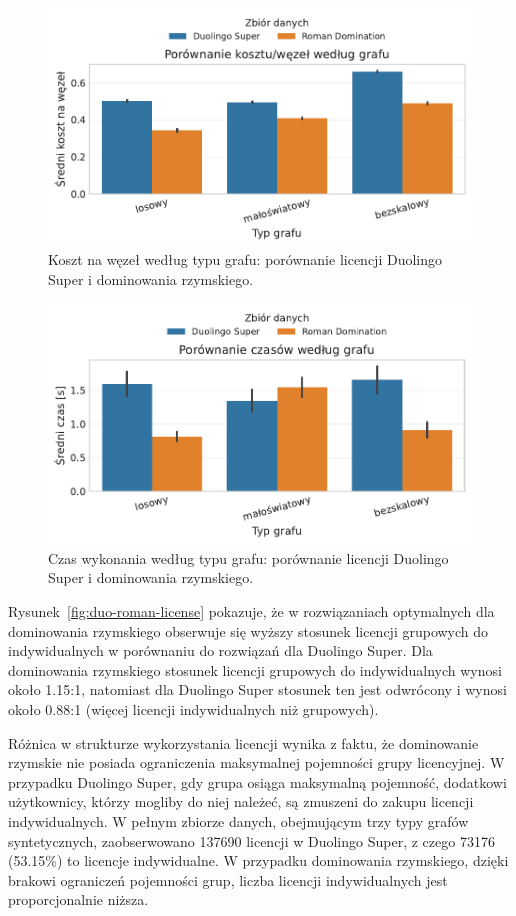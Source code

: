 \begin{figure}[H]
  \centering
  \includegraphics[width=0.6\linewidth]{assets/figures/benchmark/real/duo_vs_roman_cost_per_node_by_graph.pdf}
  \caption{Koszt na węzeł według typu grafu: porównanie licencji Duolingo Super i dominowania rzymskiego.}
  \label{fig:duo-roman-cost}
\end{figure}

\begin{figure}[H]
  \centering
  \includegraphics[width=0.6\linewidth]{assets/figures/benchmark/real/duo_vs_roman_time_by_graph.pdf}
  \caption{Czas wykonania według typu grafu: porównanie licencji Duolingo Super i dominowania rzymskiego.}
  \label{fig:duo-roman-time}
\end{figure}

Rysunek~\ref{fig:duo-roman-license} pokazuje, że w rozwiązaniach optymalnych dla dominowania rzymskiego obserwuje się wyższy stosunek licencji grupowych do indywidualnych w porównaniu do rozwiązań dla Duolingo Super. Dla dominowania rzymskiego stosunek licencji grupowych do indywidualnych wynosi około 1.15:1, natomiast dla Duolingo Super stosunek ten jest odwrócony i wynosi około 0.88:1 (więcej licencji indywidualnych niż grupowych).

Różnica w strukturze wykorzystania licencji wynika z faktu, że dominowanie rzymskie nie posiada ograniczenia maksymalnej pojemności grupy licencyjnej. W przypadku Duolingo Super, gdy grupa osiąga maksymalną pojemność, dodatkowi użytkownicy, którzy mogliby do niej należeć, są zmuszeni do zakupu licencji indywidualnych. W pełnym zbiorze danych, obejmującym trzy typy grafów syntetycznych, zaobserwowano 137690 licencji w Duolingo Super, z czego 73176 (53.15\%) to licencje indywidualne. W przypadku dominowania rzymskiego, dzięki brakowi ograniczeń pojemności grup, liczba licencji indywidualnych jest proporcjonalnie niższa.

